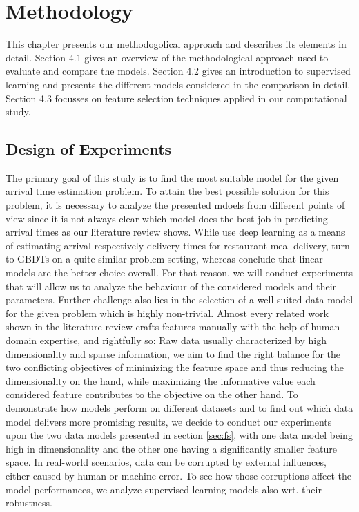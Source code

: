

\chapter{Methodology}
This chapter presents our methodogolical approach and describes its elements in detail. Section 4.1 gives an overview of the methodological approach used to evaluate and compare the models. 
Section 4.2 gives an introduction to supervised learning and presents the different models considered in the comparison in detail.
Section 4.3 focusses on feature selection techniques applied in our computational study.

\section{Design of Experiments}

The primary goal of this study is to find the most suitable model for the given arrival time estimation problem. 
To attain the best possible solution for this problem, it is necessary to analyze the presented mdoels from different points of view since it is not always clear which model does the best job in predicting arrival times as our literature review shows. 
While \cite{Zhu2020_OFCTE_DL} use deep learning as a means of estimating arrival respectively delivery times for restaurant meal delivery, \cite{Hildebrandt2020_EAT} turn to GBDTs on a quite similar problem setting, whereas \cite{Liu2018_LM_PLM} conclude that linear models are the better choice overall. 
For that reason, we will conduct experiments that will allow us to analyze the behaviour of the considered models and their parameters. 
Further challenge also lies in the selection of a well suited data model for the given problem which is highly non-trivial. 
Almost every related work shown in the literature review crafts features manually with the help of human domain expertise, and rightfully so: Raw data usually characterized by high dimensionality and sparse information, we aim to find the right balance for the two conflicting objectives of minimizing the feature space and thus reducing the dimensionality on the hand, while maximizing the informative value each considered feature contributes to the objective on the other hand. 
To demonstrate how models perform on different datasets and to find out which data model delivers more promising results, we decide to conduct our experiments upon the two data models presented in section \ref{sec:fs}, with one data model being high in dimensionality and the other one having a significantly smaller feature space.
In real-world scenarios, data can be corrupted by external influences, either caused by human or machine error. 
To see how those corruptions affect the model performances, we analyze supervised learning models also wrt. their robustness. 

